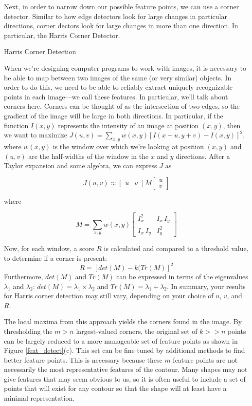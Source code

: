 \documentclass[paper=a4, fontsize=11pt]{scrartcl} %
\begin{document}
Next, in order to narrow down our possible feature points, we can use a corner detector. Similar to how edge detectors look for large changes in particular directions, corner dectors look for large changes in more than one direction. In particular, the Harris Corner Detector.

Harris Corner Detection

When we’re designing computer programs to work with images, it is necessary to be able to map between two images of the same (or very similar) objects. In order to do this, we need to be able to reliably extract uniquely recognizable points in each image---we call these features. In particular, we’ll talk about corners here. Corners can be thought of as the intersection of two edges, so the gradient of the image will be large in both directions. In particular, if the function $I(x, y)$ represents the intensity of an image at position $(x, y)$, then we want to maximize $J(u, v) = \sum_{x,y} w(x, y) [I(x+u, y+v) - I(x, y)]^2$, where $w(x, y)$ is the window over which we’re looking at position $(x, y)$ and $(u, v)$ are the half-widths of the window in the $x$ and $y$ directions. After a Taylor expansion and some algebra, we can express $J$ as 

$$
J(u, v) \approx \begin{bmatrix}
u & v
\end{bmatrix} M \begin{bmatrix}
u\\
v
\end{bmatrix}
$$

where 

$$
M = \sum_{x,y} w(x, y) \begin{bmatrix}
I_x^2 & I_x~I_y \\ I_x~I_y & I_y^2
\end{bmatrix}
$$

Now, for each window, a score $R$ is calculated and compared to a threshold value, to determine if a corner is present:
$$
R = [det(M) - k(Tr(M)]^2
$$
Furthermore, $det(M)$ and $Tr(M)$ can be expressed in terms of the eigenvalues $\lambda_1$ and $\lambda_2$: $det(M) = \lambda_1 \times \lambda_2$ and $Tr(M) = \lambda_1 + \lambda_2$. In summary, your results for Harris corner detection may still vary, depending on your choice of $u$, $v$, and $R$.

The local maxima from this approach yields the corners found in the image. By thresholding the $m > n$ largest-valued corners, the original set of $k >> n$ points can be largely reduced to a more manageable set of feature points as shown in Figure \ref{feat_detect}(c). This set can be fine tuned by additional methods to find better feature points. This is necessary because these $m$ feature points are not necessarily the most representative features of the contour. Many shapes may not give features that may seem obvious to us, so it is often useful to include a set of points that will exist for any contour so that the shape will at least have a minimal representation.  
\end{document}

